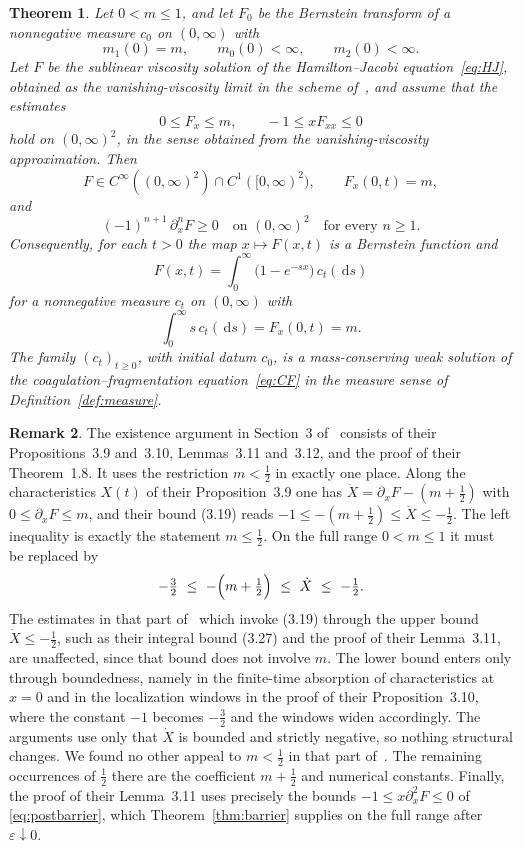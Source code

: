\documentclass[12pt]{amsart}
\numberwithin{equation}{section}
\theoremstyle{plain}
\newtheorem{theorem}{Theorem}[section]
\theoremstyle{definition}
\newtheorem{remark}[theorem]{Remark}
\newcommand{\dd}{\,\mathrm{d}}
\newcommand{\eps}{\varepsilon}
\renewcommand{\d}{\partial}
\begin{document}
\begin{theorem}
	\label{thm:Fbern}
	Let $0<m\le1$, and let $F_0$ be the Bernstein transform of a nonnegative
	measure $c_0$ on $(0,\infty)$ with
	\[
		m_1(0)=m,\qquad m_0(0)<\infty,\qquad m_2(0)<\infty .
	\]
	Let $F$ be the sublinear viscosity solution of the Hamilton--Jacobi
	equation~\eqref{eq:HJ}, obtained as the vanishing-viscosity limit
	in the scheme
	of~\cite{TV}, and assume that the estimates
	\begin{equation}\label{eq:postbarrier}
		0\le F_x\le m,\qquad -1\le xF_{xx}\le0
	\end{equation}
	hold on $(0,\infty)^2$, in the sense obtained from the vanishing-viscosity
	approximation. Then
	\[
		F\in C^\infty((0,\infty)^2)\cap C^1([0,\infty)^2),\qquad F_x(0,t)=m,
	\]
	and
	\[
		(-1)^{n+1}\,\d_x^n F\ge0\quad\text{on }(0,\infty)^2\quad\text{for
			every }n\ge1 .
	\]
	Consequently, for each $t>0$ the map $x\mapsto F(x,t)$ is a Bernstein function
	and
	\[
		F(x,t)=\int_0^\infty\bigl(1-e^{-sx}\bigr)\,c_t(\dd s)
	\]
	for a nonnegative measure $c_t$ on $(0,\infty)$ with
	\[
		\int_0^\infty s\,c_t(\dd s)=F_x(0,t)=m .
	\]
	The family $(c_t)_{t\ge0}$, with initial datum $c_0$, is a
	mass-conserving weak
	solution of the coagulation--fragmentation
	equation~\eqref{eq:CF} in the measure sense of Definition~\ref{def:measure}.
\end{theorem}

\begin{remark}\label{rem:TVconstant}
	The existence argument in Section~3 of~\cite{TV} consists of their
	Propositions~3.9 and~3.10, Lemmas~3.11 and~3.12, and the proof of their
	Theorem~1.8. It uses the restriction $m<\tfrac12$ in exactly one place.
	Along the characteristics $X(t)$ of their Proposition~3.9 one has
	$\dot X=\d_xF-(m+\tfrac12)$ with $0\le\d_xF\le m$, and their bound (3.19)
	reads $-1\le-(m+\tfrac12)\le\dot X\le-\tfrac12$. The left inequality is
	exactly the statement $m\le\tfrac12$. On the full range $0<m\le1$ it must be
	replaced by
	\[
		-\tfrac32\ \le\ -\Bigl(m+\tfrac12\Bigr)\ \le\ \dot X\ \le\ -\tfrac12 .
	\]
	The estimates in that part of~\cite{TV} which invoke (3.19) through the
	upper bound $\dot X\le-\tfrac12$, such as their integral bound (3.27) and
	the proof of their Lemma~3.11, are unaffected, since that bound does not
	involve $m$. The lower bound enters only through boundedness, namely in the
	finite-time absorption of characteristics at $x=0$ and in the localization
	windows in the proof of their Proposition~3.10, where the constant $-1$
	becomes $-\tfrac32$ and the windows widen accordingly. The arguments use
	only that $\dot X$ is bounded and strictly negative, so nothing structural
	changes. We found no other appeal to $m<\tfrac12$ in that part of~\cite{TV}.
	The remaining occurrences of $\tfrac12$ there are the coefficient
	$m+\tfrac12$ and numerical constants. Finally, the proof of their Lemma~3.11
	uses precisely the bounds $-1\le x\d_x^2F\le0$ of \eqref{eq:postbarrier},
	which Theorem~\ref{thm:barrier} supplies on the full range after
	$\eps\downarrow0$.
\end{remark}
\end{document}
